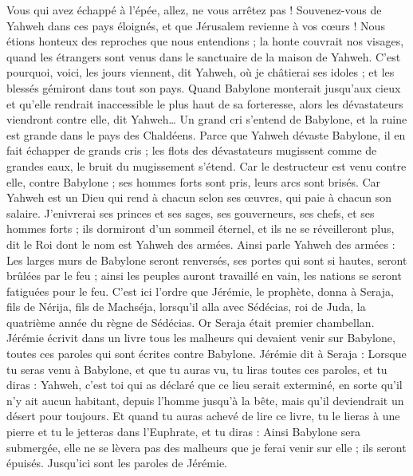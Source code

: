 \begin{multicols}{2}
Vous qui avez échappé à l'épée, allez, ne vous arrêtez pas ! Souvenez-vous de Yahweh dans ces pays éloignés, et que Jérusalem revienne à vos cœurs !
Nous étions honteux des reproches que nous entendions ; la honte couvrait nos visages, quand les étrangers sont venus dans le sanctuaire de la maison de Yahweh.
C'est pourquoi, voici, les jours viennent, dit Yahweh, où je châtierai ses idoles ; et les blessés gémiront dans tout son pays.
Quand Babylone monterait jusqu'aux cieux et qu'elle rendrait inaccessible le plus haut de sa forteresse, alors les dévastateurs viendront contre elle, dit Yahweh…
Un grand cri s'entend de Babylone, et la ruine est grande dans le pays des Chaldéens.
Parce que Yahweh dévaste Babylone, il en fait échapper de grands cris ; les flots des dévastateurs mugissent comme de grandes eaux, le bruit du mugissement s'étend.
Car le destructeur est venu contre elle, contre Babylone ; ses hommes forts sont pris, leurs arcs sont brisés. Car Yahweh est un Dieu qui rend à chacun selon ses œuvres, qui paie à chacun son salaire.
J'enivrerai ses princes et ses sages, ses gouverneurs, ses chefs, et ses hommes forts ; ils dormiront d'un sommeil éternel, et ils ne se réveilleront plus, dit le Roi dont le nom est Yahweh des armées.
Ainsi parle Yahweh des armées : Les larges murs de Babylone seront renversés, ses portes qui sont si hautes, seront brûlées par le feu ; ainsi les peuples auront travaillé en vain, les nations se seront fatiguées pour le feu.
C'est ici l'ordre que Jérémie, le prophète, donna à Seraja, fils de Nérija, fils de Machséja, lorsqu'il alla avec Sédécias, roi de Juda, la quatrième année du règne de Sédécias. Or Seraja était premier chambellan.
Jérémie écrivit dans un livre tous les malheurs qui devaient venir sur Babylone, toutes ces paroles qui sont écrites contre Babylone.
Jérémie dit à Seraja : Lorsque tu seras venu à Babylone, et que tu auras vu, tu liras toutes ces paroles,
et tu diras : Yahweh, c'est toi qui as déclaré que ce lieu serait exterminé, en sorte qu'il n'y ait aucun habitant, depuis l'homme jusqu'à la bête, mais qu'il deviendrait un désert pour toujours.
Et quand tu auras achevé de lire ce livre, tu le lieras à une pierre et tu le jetteras dans l'Euphrate,
et tu diras : Ainsi Babylone sera submergée, elle ne se lèvera pas des malheurs que je ferai venir sur elle ; ils seront épuisés. Jusqu'ici sont les paroles de Jérémie.

\end{multicols}

